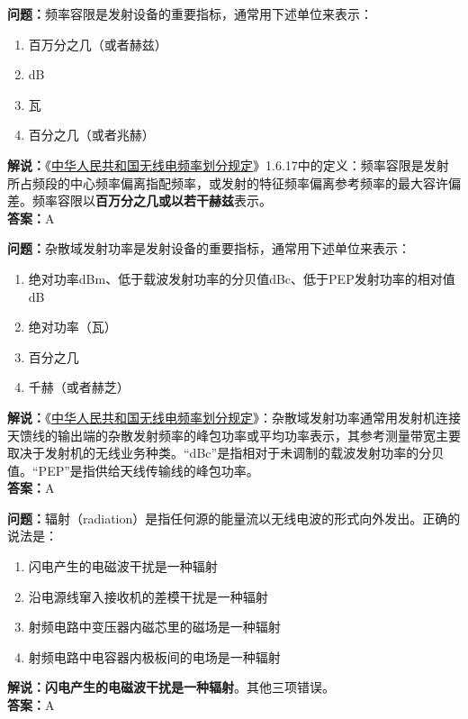 \textbf{问题：}频率容限是发射设备的重要指标，通常用下述单位来表示：
\begin{enumerate}[label=\Alph*), leftmargin=1cm]
	\item 百万分之几（或者赫兹）
	\item dB
	\item 瓦
	\item 百分之几（或者兆赫）
\end{enumerate}
\textbf{解说：}《\href{https://www.miit.gov.cn/zwgk/zcwj/wjfb/txy/art/2020/art_066386284cd2449493586c81ccafed11.html}{中华人民共和国无线电频率划分规定}》1.6.17中的定义：频率容限是发射所占频段的中心频率偏离指配频率，或发射的特征频率偏离参考频率的最大容许偏差。频率容限以\textbf{百万分之几或以若干赫兹}表示。\\\textbf{答案：}A

\textbf{问题：}杂散域发射功率是发射设备的重要指标，通常用下述单位来表示：
\begin{enumerate}[label=\Alph*), leftmargin=1cm]
	\item 绝对功率dBm、低于载波发射功率的分贝值dBc、低于PEP发射功率的相对值dB
	\item 绝对功率（瓦）
	\item 百分之几
	\item 千赫（或者赫芝）
\end{enumerate}
\textbf{解说：}《\href{https://www.miit.gov.cn/zwgk/zcwj/wjfb/txy/art/2020/art_066386284cd2449493586c81ccafed11.html}{中华人民共和国无线电频率划分规定}》：杂散域发射功率通常用发射机连接天馈线的输出端的杂散发射频率的峰包功率或平均功率表示，其参考测量带宽主要取决于发射机的无线业务种类。“dBc”是指相对于未调制的载波发射功率的分贝值。“PEP”是指供给天线传输线的峰包功率。\\\textbf{答案：}A%

\textbf{问题：}辐射（radiation）是指任何源的能量流以无线电波的形式向外发出。正确的说法是：
\begin{enumerate}[label=\Alph*), leftmargin=1cm]
	\item 闪电产生的电磁波干扰是一种辐射
	\item 沿电源线窜入接收机的差模干扰是一种辐射
	\item 射频电路中变压器内磁芯里的磁场是一种辐射
	\item 射频电路中电容器内极板间的电场是一种辐射
\end{enumerate}
\textbf{解说：闪电产生的电磁波干扰是一种辐射}。其他三项错误。\\\textbf{答案：}A%

